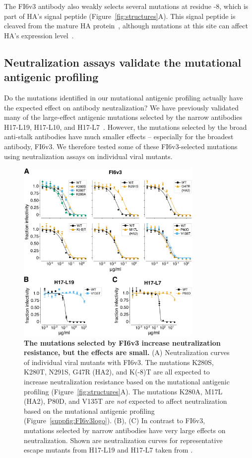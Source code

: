\documentclass[11pt]{article}
\begin{document}
The FI6v3 antibody also weakly selects several mutations at residue -8, which is part of HA's signal peptide (Figure~\ref{fig:structures}A). 
This signal peptide is cleaved from the mature HA protein~\citep{daniels2003n,burke2014recommended}, although mutations at this site can affect HA's expression level~\citep{nordholm2017translational}.

\subsection*{Neutralization assays validate the mutational antigenic profiling}
Do the mutations identified in our mutational antigenic profiling actually have the expected effect on antibody neutralization?
We have previously validated many of the large-effect antigenic mutations selected by the narrow antibodies H17-L19, H17-L10, and H17-L7~\citep{doud2017complete}.
However, the mutations selected by the broad anti-stalk antibodies have much smaller effects -- especially for the broadest antibody, FI6v3.
We therefore tested some of these FI6v3-selected mutations using neutralization assays on individual viral mutants.

\begin{figure}
\centerline{\includegraphics[width=0.8\textwidth]{figs/FI6v3mutant_neutcurves/FI6v3_mutant_neutcurves.pdf}}
\caption{
\label{fig:FI6v3neutcurves}
{\bf The mutations selected by FI6v3 increase neutralization resistance, but the effects are small.}
(A) Neutralization curves of individual viral mutants with FI6v3.
The mutations K280S, K280T, N291S, G47R (HA2), and K(-8)T are all expected to increase neutralization resistance based on the mutational antigenic profiling (Figure~\ref{fig:structures}A). 
The mutations K280A, M17L (HA2), P80D, and V135T are \emph{not} expected to affect neutralization based on the mutational antigenic profiling (Figure~\ref{suppfig:FI6v3logo}).
(B), (C) In contrast to FI6v3, mutations selected by narrow antibodies have very large effects on neutralization.
Shown are neutralization curves for representative escape mutants from H17-L19 and H17-L7 taken from \citet{doud2017complete}.
}
\end{figure}
\end{document}
